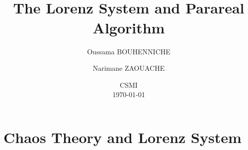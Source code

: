 \documentclass[
	11pt,
]{beamer}
\title[Lorenz System and Parareal]{ \text{Exploring Chaos Theory} \\ \textbf{The Lorenz System and Parareal Algorithm}}
\author[O. BOUHENNICHE \and N. ZAOUACHE]{Oussama BOUHENNICHE \and Narimane ZAOUACHE}
\institute[]{University of Strasbourg}
\date[\today]{ CSMI \\ \today}
\begin{document}

\begin{frame}
	\titlepage
\end{frame}


\section{Chaos Theory and Lorenz System} 
\end{document}
